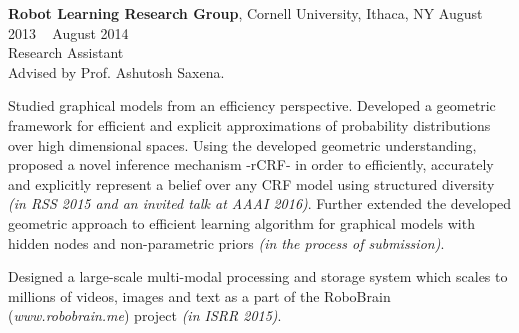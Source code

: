     \textbf{Robot Learning Research Group}, Cornell University, Ithaca, NY \hfill August 2013 \textendash ~ August 2014\vspace{0mm}\\\vspace{0mm}
    \hspace{-1mm}Research Assistant  \hfill \vspace{1.5mm} \\
  Advised by Prof. Ashutosh Saxena.

Studied graphical models from an efficiency perspective. Developed a geometric framework for efficient and explicit approximations of probability distributions over high dimensional spaces. Using the developed geometric understanding, proposed a novel inference mechanism -rCRF- in order to efficiently, accurately and explicitly represent a belief over any CRF model using structured diversity \emph{(in RSS 2015 and an invited talk at AAAI 2016)}. Further extended the developed geometric approach to efficient learning algorithm for graphical models with hidden nodes and non-parametric priors \emph{(in the process of submission)}.

Designed a large-scale multi-modal processing and storage system which scales to millions of videos, images and text as a part of the RoboBrain (\emph{www.robobrain.me}) project \emph{(in ISRR 2015)}.
